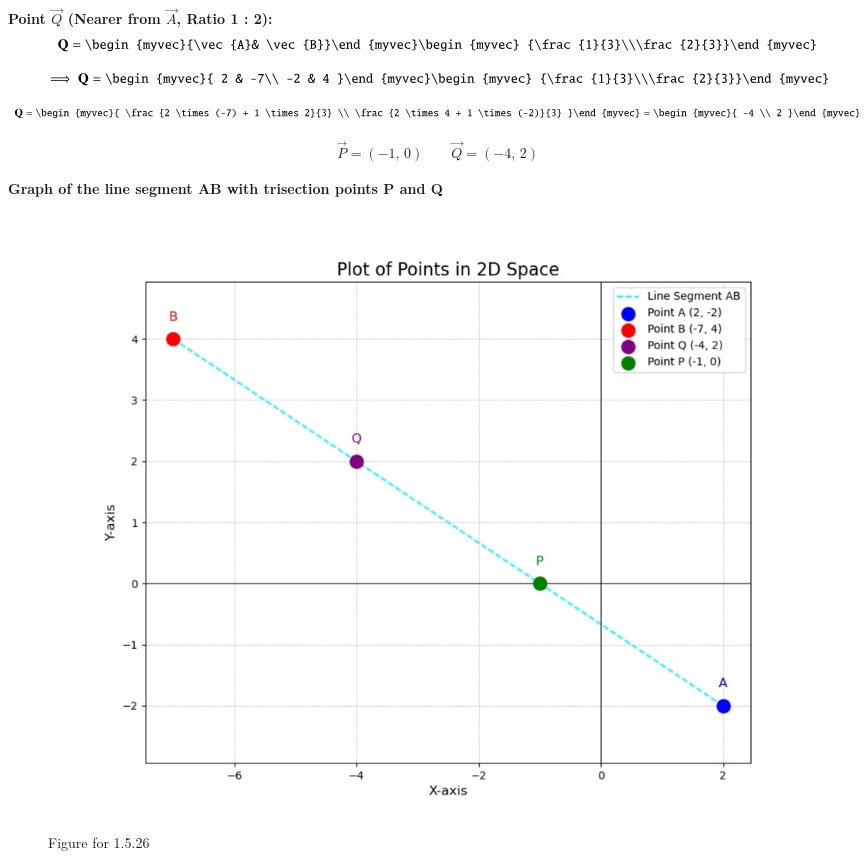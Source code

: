 \documentclass{beamer}
\begin{document}
\begin{frame}
\textbf{Point \( \vec{Q} \) (Nearer from \( \vec{A} \), Ratio 1 : 2):}
\begin{align}   
\vec{Q} = \begin{myvec}{\vec{A}& \vec{B}}\end{myvec}\begin{myvec}
        {\frac{1}{3}\\\frac{2}{3}}\end{myvec}    
\end{align}       

\begin{align}
\implies \vec{Q}=\begin{myvec}{ 2 & -7\\ -2 & 4 }\end{myvec}\begin{myvec}
        {\frac{1}{3}\\\frac{2}{3}}\end{myvec}\\
\end{align}


\begin{align}
\vec{Q} = \begin{myvec}{
\frac{2 \times (-7) + 1 \times 2}{3} \\
\frac{2 \times 4 + 1 \times (-2)}{3}
}\end{myvec}= \begin{myvec}{ -4 \\ 2 }\end{myvec}
\end{align}

    
\begin{align}
\vec{P}= (-1,\,0)\qquad \vec{Q}= (-4,\,2)
\end{align}    
\end{frame}

\begin{frame}
    \vspace{5em}
\textbf{Graph of the line segment AB with trisection points P and Q}
\begin{figure}[H]
    \centering
    \includegraphics[width=0.75\columnwidth]{figs/1.jpg}
    \caption{Figure for 1.5.26}
    \label{fig1}
\end{figure}
\end{frame}
\end{document}
